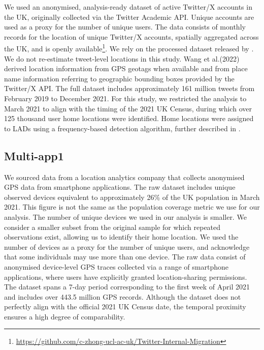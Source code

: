 \documentclass[]{rsos}%
\begin{document}
We used an anonymised, analysis-ready dataset of active Twitter/X
accounts in the UK, originally collected via the Twitter Academic API.
Unique accounts are used as a proxy for the number of unique users. The
data consists of monthly records for the location of unique Twitter/X
accounts, spatially aggregated across the UK, and is openly
available\footnote{\url{https://github.com/c-zhong-ucl-ac-uk/Twitter-Internal-Migration}}. We rely on the processed dataset released by \citep{wang2022}.
We do not re-estimate tweet-level locations in this study. Wang et
al.(2022) derived location information from GPS geotags when available
and from place name information referring to geographic bounding boxes
provided by the Twitter/X API. The full dataset includes approximately
161 million tweets from February 2019 to December 2021. For this study,
we restricted the analysis to March 2021 to align with the timing of the
2021 UK Census, during which over 125 thousand user home locations were
identified. Home locations were assigned to LADs using a frequency-based
detection algorithm, further described in \citep{wang2022}.

\subsection{Multi-app1}\label{multi-app1}

We sourced data from a location analytics company that collects
anonymised GPS data from smartphone applications. The raw dataset
includes unique observed devices equivalent to approximately 26\% of the
UK population in March 2021. This figure is not the same as the
population coverage metric we use for our analysis. The number of unique
devices we used in our analysis is smaller. We consider a smaller subset from the original sample for which repeated observations exist, allowing us to identify their home location. We used the number of devices as a proxy for the
number of unique users, and acknowledge that some individuals may use
more than one device. The raw data consist of anonymised device-level
GPS traces collected via a range of smartphone applications, where users
have explicitly granted location-sharing permissions. The dataset spans
a 7-day period corresponding to the first week of April 2021 and
includes over 443.5 million GPS records. Although the dataset does not
perfectly align with the official 2021 UK Census date, the temporal
proximity ensures a high degree of comparability.
\end{document}
